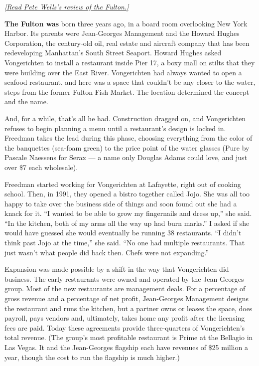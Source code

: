 \href{https://www.nytimes.com/2019/07/30/dining/the-fulton-review-pete-wells-jean-georges.html}{\emph{{[}Read
Pete Wells's review of the Fulton.{]}}}

\textbf{The Fulton was} born three years ago, in a board room
overlooking New York Harbor. Its parents were Jean-Georges Management
and the Howard Hughes Corporation, the century-old oil, real estate and
aircraft company that has been redeveloping Manhattan's South Street
Seaport. Howard Hughes asked Vongerichten to install a restaurant inside
Pier 17, a boxy mall on stilts that they were building over the East
River. Vongerichten had always wanted to open a seafood restaurant, and
here was a space that couldn't be any closer to the water, steps from
the former Fulton Fish Market. The location determined the concept and
the name.

And, for a while, that's all he had. Construction dragged on, and
Vongerichten refuses to begin planning a menu until a restaurant's
design is locked in. Freedman takes the lead during this phase, choosing
everything from the color of the banquettes (sea-foam green) to the
price point of the water glasses (Pure by Pascale Naessens for Serax ---
a name only Douglas Adams could love, and just over \$7 each wholesale).

Freedman started working for Vongerichten at Lafayette, right out of
cooking school. Then, in 1991, they opened a bistro together called
Jojo. She was all too happy to take over the business side of things and
soon found out she had a knack for it. ``I wanted to be able to grow my
fingernails and dress up,'' she said. ``In the kitchen, both of my arms
all the way up had burn marks.'' I asked if she would have guessed she
would eventually be running 38 restaurants. ``I didn't think past Jojo
at the time,'' she said. ``No one had multiple restaurants. That just
wasn't what people did back then. Chefs were not expanding.''

Expansion was made possible by a shift in the way that Vongerichten did
business. The early restaurants were owned and operated by the
Jean-Georges group. Most of the new restaurants are management deals.
For a percentage of gross revenue and a percentage of net profit,
Jean-Georges Management designs the restaurant and runs the kitchen, but
a partner owns or leases the space, does payroll, pays vendors and,
ultimately, takes home any profit after the licensing fees are paid.
Today these agreements provide three-quarters of Vongerichten's total
revenue. (The group's most profitable restaurant is Prime at the
Bellagio in Las Vegas. It and the Jean-Georges flagship each have
revenues of \$25 million a year, though the cost to run the flagship is
much higher.)

